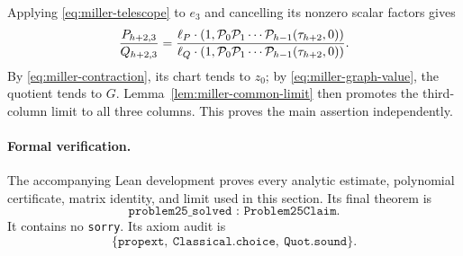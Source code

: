 Applying \eqref{eq:miller-telescope} to $e_3$ and cancelling its nonzero
scalar factors gives
\[
\frac{P_{h+2,3}}{Q_{h+2,3}}
=
\frac{\ell_P\cdot
 (1,{\cal P}_0{\cal P}_1\cdots{\cal P}_{h-1}(\tau_{h+2},0))}
{\ell_Q\cdot
 (1,{\cal P}_0{\cal P}_1\cdots{\cal P}_{h-1}(\tau_{h+2},0))}.
\]
By \eqref{eq:miller-contraction}, its chart tends to $z_0$; by
\eqref{eq:miller-graph-value}, the quotient tends to $G$.
Lemma~\ref{lem:miller-common-limit} then promotes the third-column limit to
all three columns.  This proves the main assertion independently.

\paragraph{Formal verification.}
The accompanying Lean development proves every analytic estimate,
polynomial certificate, matrix identity, and limit used in this section.
Its final theorem is
\[
       \texttt{problem25\_solved : Problem25Claim}.
\]
It contains no \texttt{sorry}.  Its axiom audit is
\[
 \{\texttt{propext},\ \texttt{Classical.choice},\ \texttt{Quot.sound}\}.
\]
